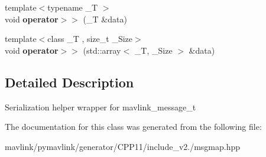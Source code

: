 \begin{DoxyCompactItemize}
\item 
\mbox{\label{classmavlink_1_1MsgMap_ada013c1d270ab080a6a11a60c67519d6}} 
{\footnotesize template$<$typename \+\_\+T $>$ }\\void {\bfseries operator$>$$>$} (\+\_\+T \&data)
\item 
\mbox{\label{classmavlink_1_1MsgMap_a3e446ddceb5afa98cfdf86fcbe20b30d}} 
{\footnotesize template$<$class \+\_\+T , size\+\_\+t \+\_\+\+Size$>$ }\\void {\bfseries operator$>$$>$} (std\+::array$<$ \+\_\+T, \+\_\+\+Size $>$ \&data)
\end{DoxyCompactItemize}


\subsection{Detailed Description}
Serialization helper wrapper for mavlink\+\_\+message\+\_\+t 

The documentation for this class was generated from the following file\+:\begin{DoxyCompactItemize}
\item 
mavlink/pymavlink/generator/\+C\+P\+P11/include\+\_\+v2./msgmap.\+hpp\end{DoxyCompactItemize}

